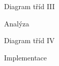 

\begin{frame}{Diagram tříd III}

Analýza

\begin{figure}
\end{figure}

\end{frame}



\begin{frame}{Diagram tříd IV}

Implementace

\begin{figure}
\end{figure}

\end{frame}